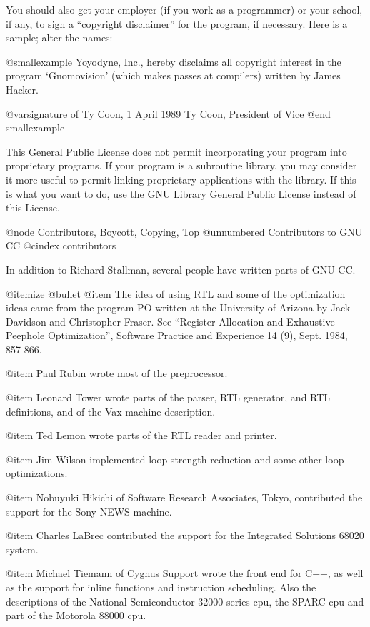 You should also get your employer (if you work as a programmer) or your
school, if any, to sign a ``copyright disclaimer'' for the program, if
necessary.  Here is a sample; alter the names:

@smallexample
Yoyodyne, Inc., hereby disclaims all copyright interest in the program
`Gnomovision' (which makes passes at compilers) written by James Hacker.

@var{signature of Ty Coon}, 1 April 1989
Ty Coon, President of Vice
@end smallexample

This General Public License does not permit incorporating your program into
proprietary programs.  If your program is a subroutine library, you may
consider it more useful to permit linking proprietary applications with the
library.  If this is what you want to do, use the GNU Library General
Public License instead of this License.

@node Contributors, Boycott, Copying, Top
@unnumbered Contributors to GNU CC
@cindex contributors

In addition to Richard Stallman, several people have written parts
of GNU CC.

@itemize @bullet
@item
The idea of using RTL and some of the optimization ideas came from the
program PO written at the University of Arizona by Jack Davidson and
Christopher Fraser.  See ``Register Allocation and Exhaustive Peephole
Optimization'', Software Practice and Experience 14 (9), Sept. 1984,
857-866.

@item
Paul Rubin wrote most of the preprocessor.

@item
Leonard Tower wrote parts of the parser, RTL generator, and RTL
definitions, and of the Vax machine description.

@item
Ted Lemon wrote parts of the RTL reader and printer.

@item
Jim Wilson implemented loop strength reduction and some other
loop optimizations.

@item
Nobuyuki Hikichi of Software Research Associates, Tokyo, contributed
the support for the Sony NEWS machine.

@item
Charles LaBrec contributed the support for the Integrated Solutions
68020 system.

@item
Michael Tiemann of Cygnus Support wrote the front end for C++, as well
as the support for inline functions and instruction scheduling.  Also
the descriptions of the National Semiconductor 32000 series cpu, the
SPARC cpu and part of the Motorola 88000 cpu.


